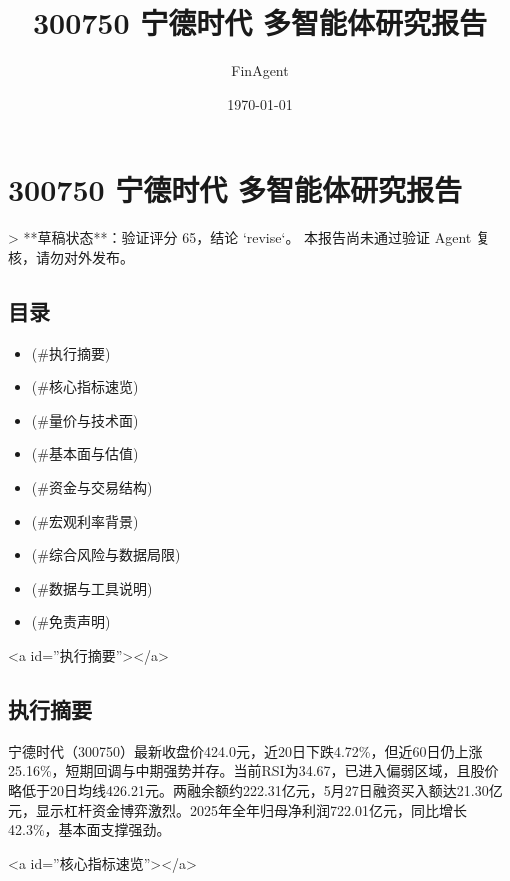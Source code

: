 \documentclass[12pt,a4paper]{article}
\title{300750 宁德时代 多智能体研究报告}
\author{FinAgent}
\date{\today}
\begin{document}
\maketitle
\tableofcontents
\newpage
\sloppy
\section{300750 宁德时代 多智能体研究报告}

> **草稿状态**：验证评分 65，结论 `revise`。 本报告尚未通过验证 Agent 复核，请勿对外发布。

\subsection{ 目录}

\begin{itemize}
\item [执行摘要](\#执行摘要)
\item [核心指标速览](\#核心指标速览)
\item [量价与技术面](\#量价与技术面)
\item [基本面与估值](\#基本面与估值)
\item [资金与交易结构](\#资金与交易结构)
\item [宏观利率背景](\#宏观利率背景)
\item [综合风险与数据局限](\#综合风险与数据局限)
\item [数据与工具说明](\#数据与工具说明)
\item [免责声明](\#免责声明)
\end{itemize}

<a id=''执行摘要''></a>

\subsection{ 执行摘要}
宁德时代（300750）最新收盘价424.0元，近20日下跌4.72\%，但近60日仍上涨25.16\%，短期回调与中期强势并存。当前RSI为34.67，已进入偏弱区域，且股价略低于20日均线426.21元。两融余额约222.31亿元，5月27日融资买入额达21.30亿元，显示杠杆资金博弈激烈。2025年全年归母净利润722.01亿元，同比增长42.3\%，基本面支撑强劲。

<a id=''核心指标速览''></a>
\end{document}
